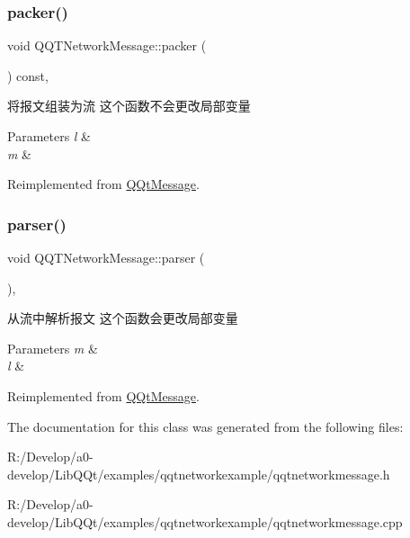 \subsubsection{\texorpdfstring{packer()}{packer()}}
{\footnotesize\ttfamily void Q\+Q\+T\+Network\+Message\+::packer (\begin{DoxyParamCaption}\item[{Q\+Byte\+Array \&}]{ }\end{DoxyParamCaption}) const\hspace{0.3cm}{\ttfamily [override]}, {\ttfamily [virtual]}}



将报文组装为流 这个函数不会更改局部变量 


\begin{DoxyParams}{Parameters}
{\em l} & \\
\hline
{\em m} & \\
\hline
\end{DoxyParams}


Reimplemented from \mbox{\hyperlink{class_q_qt_message_af1885c2c3628495808dca66ee8d72e14}{Q\+Qt\+Message}}.

\mbox{\label{class_q_q_t_network_message_a56a22ccc712447fb573536a9d51b36d6}} 
\subsubsection{\texorpdfstring{parser()}{parser()}}
{\footnotesize\ttfamily void Q\+Q\+T\+Network\+Message\+::parser (\begin{DoxyParamCaption}\item[{const Q\+Byte\+Array \&}]{ }\end{DoxyParamCaption})\hspace{0.3cm}{\ttfamily [override]}, {\ttfamily [virtual]}}



从流中解析报文 这个函数会更改局部变量 


\begin{DoxyParams}{Parameters}
{\em m} & \\
\hline
{\em l} & \\
\hline
\end{DoxyParams}


Reimplemented from \mbox{\hyperlink{class_q_qt_message_a0bc25669bdd61490b1d8df6d77565f31}{Q\+Qt\+Message}}.



The documentation for this class was generated from the following files\+:\begin{DoxyCompactItemize}
\item 
R\+:/\+Develop/a0-\/develop/\+Lib\+Q\+Qt/examples/qqtnetworkexample/qqtnetworkmessage.\+h\item 
R\+:/\+Develop/a0-\/develop/\+Lib\+Q\+Qt/examples/qqtnetworkexample/qqtnetworkmessage.\+cpp\end{DoxyCompactItemize}
